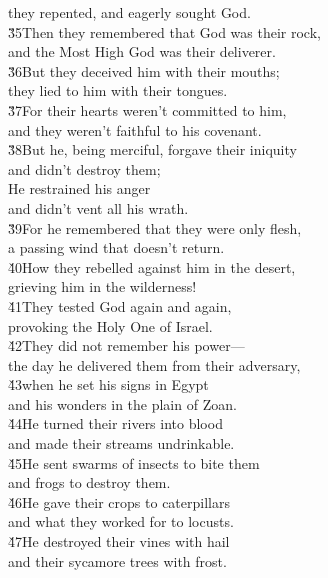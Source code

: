 \begin{poetry}
\poemll    they repented, and eagerly sought God. \\
\poeml \v{35}Then they remembered that God was their rock, \\
\poemll    and the Most High God was their deliverer. \\
\poeml \v{36}But they deceived him with their mouths; \\
\poemll    they lied to him with their tongues. \\
\poeml \v{37}For their hearts weren't committed to him, \\
\poemll    and they weren't faithful to his covenant. \\
\poeml \v{38}But he, being merciful, forgave their iniquity \\
\poemll    and didn't destroy them; \\
\poeml He restrained his anger \\
\poemll    and didn't vent all his wrath. \\
\poeml \v{39}For he remembered that they were only flesh, \\
\poemll    a passing wind that doesn't return. \\
\poeml \v{40}How they rebelled against him in the desert, \\
\poemll    grieving him in the wilderness! \\
\poeml \v{41}They tested God again and again, \\
\poemll    provoking the Holy One of Israel. \\
\poeml \v{42}They did not remember his power--- \\
\poemll    the day he delivered them from their adversary, \\
\poeml \v{43}when he set his signs in Egypt \\
\poemll    and his wonders in the plain of Zoan. \\
\poeml \v{44}He turned their rivers into blood \\
\poemll    and made their streams undrinkable. \\
\poeml \v{45}He sent swarms of insects to bite them \\
\poemll    and frogs to destroy them. \\
\poeml \v{46}He gave their crops to caterpillars \\
\poemll    and what they worked for to locusts. \\
\poeml \v{47}He destroyed their vines with hail \\
\poemll    and their sycamore trees with frost. \\

\end{poetry}
